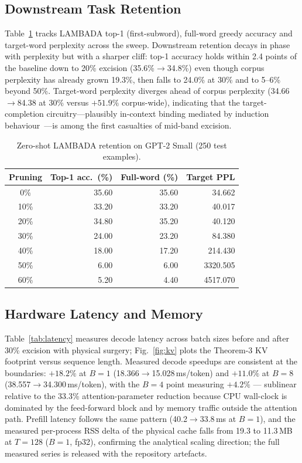 \documentclass[10pt,journal,compsoc]{IEEEtran}
\begin{document}
\subsection{Downstream Task Retention}
Table~\ref{tab:downstream} tracks LAMBADA top-1 (first-subword), full-word greedy
accuracy and target-word perplexity across the sweep. Downstream retention decays
in phase with perplexity but with a sharper cliff: top-1 accuracy holds within
2.4 points of the baseline down to 20\% excision (35.6\%$\to$34.8\%) even though
corpus perplexity has already grown 19.3\%, then falls to 24.0\% at 30\% and to
5--6\% beyond 50\%. Target-word perplexity diverges ahead of corpus perplexity
(34.66$\to$84.38 at 30\% versus $+51.9\%$ corpus-wide), indicating that the
target-completion circuitry---plausibly in-context binding mediated by induction
behaviour~\cite{olsson2022context}---is among the first casualties of
mid-band excision.

\begin{table}[!t]
\caption{Zero-shot LAMBADA retention on GPT-2 Small (250 test examples).}
\label{tab:downstream}
\centering
\footnotesize
\scriptsize
\begin{tabular}{crrr}
\toprule
Pruning & Top-1 acc.\ (\%) & Full-word (\%) & Target PPL \\
\midrule
0\% & 35.60 & 35.60 & 34.662 \\
10\% & 33.20 & 33.20 & 40.017 \\
20\% & 34.80 & 35.20 & 40.120 \\
30\% & 24.00 & 23.20 & 84.380 \\
40\% & 18.00 & 17.20 & 214.430 \\
50\% & 6.00 & 6.00 & 3320.505 \\
60\% & 5.20 & 4.40 & 4517.070 \\
\bottomrule
\end{tabular}
\end{table}

\subsection{Hardware Latency and Memory}
\label{sec:hardware}
Table~\ref{tab:latency} measures decode latency across batch sizes before and
after 30\% excision with physical surgery; Fig.~\ref{fig:kv} plots the
Theorem-3 KV footprint versus sequence length. Measured decode speedups are
consistent at the boundaries: $+18.2\%$ at $B{=}1$ (18.366$\to$15.028\,ms/token)
and $+11.0\%$ at $B{=}8$ (38.557$\to$34.300\,ms/token), with the $B{=}4$ point
measuring $+4.2\%$ --- sublinear relative to the 33.3\% attention-parameter
reduction because CPU wall-clock is dominated by the feed-forward block and by
memory traffic outside the attention path. Prefill latency follows the same
pattern (40.2$\to$33.8\,ms at $B{=}1$), and the measured per-process RSS delta of
the physical cache falls from 19.3 to 11.3\,MB at $T{=}128$ ($B{=}1$, fp32),
confirming the analytical scaling direction; the full measured series is released
with the repository artefacts.
\end{document}
